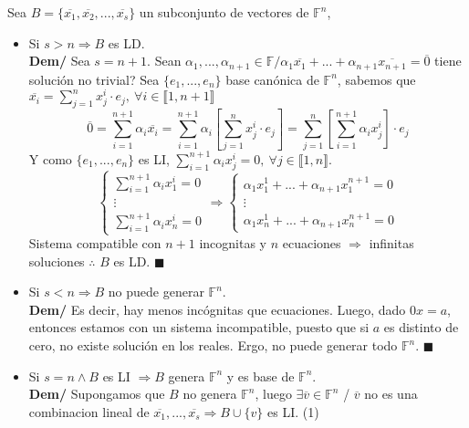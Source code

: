 \documentclass[11pt,a4paper]{article}
\newcommand*{\QEDA}{\null\nobreak\hfill\ensuremath{\blacksquare}}
\begin{document}
Sea $B = \{ \overline{x_1}, \overline{x_2}, ..., \overline{x_s} \}$ un subconjunto de vectores de $\mathbb{F}^n$,
\begin{itemize}
\itemsep-0.3em
\item Si $s>n \Rightarrow B$ es LD.\\
\textbf{Dem/} Sea $s=n+1$. Sean $\alpha_1, ..., \alpha_{n+1} \in \mathbb{F} / \alpha_1\overline{x_1} + ... + \alpha_{n+1}\overline{x_{n+1}} = \overline{0}$ tiene soluci\'on no trivial?
Sea $\{e_1,...,e_n\}$ base can\'onica de $\mathbb{F}^n$, sabemos que $\overline{x_i} = \sum_{j=1}^n x_j^i \cdot e_j,\ \forall i \in \llbracket 1, n+1 \rrbracket$\\
$$\overline{0} = \sum_{i=1}^{n+1} \alpha_i \overline{x_i} = \sum_{i=1}^{n+1} \alpha_i \left[ \sum_{j=1}^n x_j^i \cdot e_j \right] = \sum_{j=1}^n \left[ \sum_{i=1}^{n+1} \alpha_i x_j^i\right] \cdot e_j$$
Y como $\{e_1,...,e_n\}$ es LI, $\sum_{i=1}^{n+1} \alpha_i x_j^i = 0,\ \forall j \in \llbracket 1, n \rrbracket$. 
$$ \left\{ \begin{array}{c} \sum_{i=1}^{n+1} \alpha_i x_1^i = 0 \\ \vdots \\ \sum_{i=1}^{n+1} \alpha_i x_n^i = 0 \end{array} \right. \Rightarrow \left\{ \begin{array}{c} \alpha_1 x_1^1 + ... + \alpha_{n+1} x_1^{n+1} = 0 \\ \vdots \\ \alpha_1 x_n^1 + ... + \alpha_{n+1} x_n^{n+1} = 0 \end{array} \right.$$
Sistema compatible con $n+1$ incognitas y $n$ ecuaciones $\Rightarrow$ infinitas soluciones $\therefore$ $B$ es LD. \QEDA
\item Si $s<n \Rightarrow B$ no puede generar $\mathbb{F}^n$.\\
\textbf{Dem/} Es decir, hay menos inc\'ognitas que ecuaciones. Luego, dado $0x=a$, entonces estamos con un sistema incompatible, puesto que si $a$ es distinto de cero, no existe soluci\'on en los reales. Ergo, no puede generar todo $\mathbb{F}^n$. \QEDA
\item Si $s=n \land B$ es LI $\Rightarrow B$ genera $\mathbb{F}^n$ y es base de $\mathbb{F}^n$.\\
\textbf{Dem/} Supongamos que $B$ no genera $\mathbb{F}^n$, luego $\exists \overline{v} \in \mathbb{F}^n$ / $\overline{v}$ no es una combinacion lineal de $\overline{x_1},...,\overline{x_s} \Rightarrow B \cup \{v\}$ es LI. \hfill (1)\\

\end{itemize}
\end{document}
